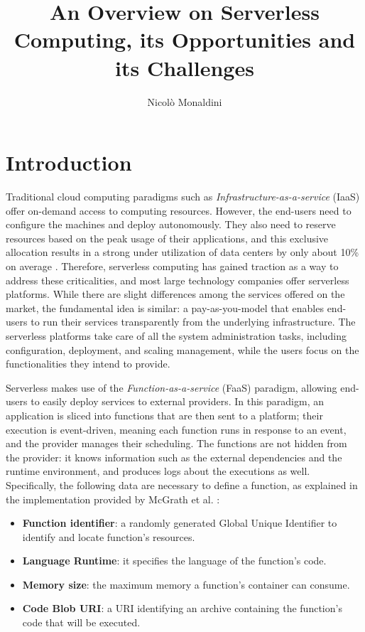 \documentclass[
	a4paper, %
	12pt,
	twoside, %
]{LTJournalArticle}
\title{An Overview on Serverless Computing, its Opportunities and its Challenges} %
\author{%
	Nicolò Monaldini
}
\begin{document}
\maketitle %


\section{Introduction}
\label{sec:introduction}

Traditional cloud computing paradigms such as \textit{Infrastructure-as-a-service} (IaaS) offer on-demand access to computing resources. However, the end-users need to configure the machines and deploy autonomously. They also need to reserve resources based on the peak usage of their applications, and this exclusive allocation results in a strong under utilization of data centers by only about 10\% on average \cite{li_serverless_2022}. Therefore, serverless computing has gained traction as a way to address these criticalities, and most large technology companies offer serverless platforms. While there are slight differences among the services offered on the market, the fundamental idea is similar: a pay-as-you-model that enables end-users to run their services transparently from the underlying infrastructure. The serverless platforms take care of all the system administration tasks, including configuration, deployment, and scaling management, while the users focus on the functionalities they intend to provide.

Serverless makes use of the \textit{Function-as-a-service} (FaaS) paradigm, allowing end-users to easily deploy services to external providers. In this paradigm, an application is sliced into functions that are then sent to a platform; their execution is event-driven, meaning each function runs in response to an event, and the provider manages their scheduling. The functions are not hidden from the provider: it knows information such as the external dependencies and the runtime environment, and produces logs about the executions as well. Specifically, the following data are necessary to define a function, as explained in the implementation provided by McGrath et al. \cite{mcgrath_serverless_2017}:

\begin{itemize}
	\item \textbf{Function identifier}: a randomly generated Global Unique Identifier to identify and locate function's resources.
	\item \textbf{Language Runtime}: it specifies the language of the function's code.
	\item \textbf{Memory size}: the maximum memory a function's container can consume.
	\item \textbf{Code Blob URI}: a URI identifying an archive containing the function's code that will be executed.
\end{itemize}
\end{document}
